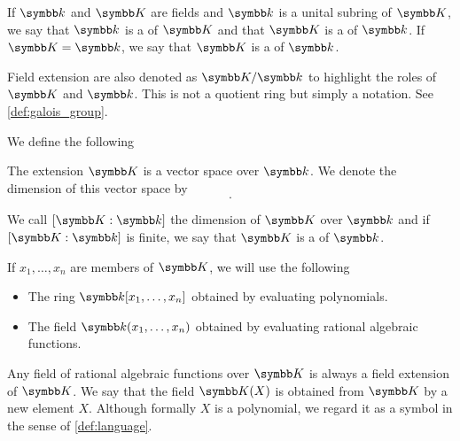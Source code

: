 \begin{definition}\label{def:field_extension}
  If \( \Bk \) and \( \BK \) are fields and \( \Bk \) is a unital subring of \( \BK \), we say that \( \Bk \) is a  of \( \BK \) and that \( \BK \) is a  of \( \Bk \). If \( \BK = \Bk \), we say that \( \BK \) is a  of \( \Bk \).

  Field extension are also denoted as \( \BK / \Bk \) to highlight the roles of \( \BK \) and \( \Bk \). This is not a quotient ring but simply a notation. See \cref{def:galois_group}.

  We define the following
  \begin{defenum}
     The extension \( \BK \) is a vector space over \( \Bk \). We denote the dimension of this vector space by
    \begin{equation*}
      [\BK : \Bk].
    \end{equation*}

    We call \( [\BK : \Bk] \) the dimension of \( \BK \) over \( \Bk \) and if \( [\BK : \Bk] \) is finite, we say that \( \BK \) is a  of \( \Bk \).

     If \( x_1, \ldots, x_n \) are members of \( \BK \), we will use the following 
    \begin{itemize}
      \item The ring \( \Bk[x_1, \ldots, x_n] \) obtained by evaluating polynomials.
      \item The field \( \Bk(x_1, \ldots, x_n) \) obtained by evaluating rational algebraic functions.
    \end{itemize}
  \end{defenum}
\end{definition}

\begin{remark}\label{remark:adjoint_extension_field}
  Any field of rational algebraic functions over \( \BK \) is always a field extension of \( \BK \). We say that the field \( \BK(X) \) is obtained from \( \BK \) by  a new element \( X \). Although formally \( X \) is a polynomial, we regard it as a symbol in the sense of \cref{def:language}.
\end{remark}

